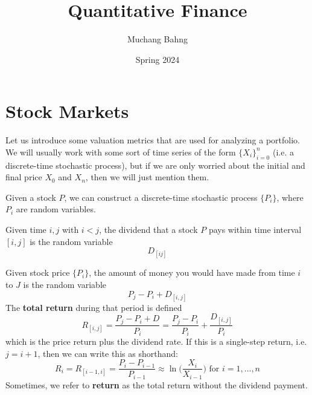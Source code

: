 \documentclass{article}
\begin{document}
\title{Quantitative Finance}
\author{Muchang Bahng}
\date{Spring 2024}

\maketitle
\tableofcontents
\pagebreak

\section{Stock Markets}

    Let us introduce some valuation metrics that are used for analyzing a portfolio. We will usually work with some sort of time series of the form $\{X_i\}_{i=0}^n$ (i.e. a discrete-time stochastic process), but if we are only worried about the initial and final price $X_0$ and $X_n$, then we will just mention them. 

    \begin{definition}
      Given a stock $P$, we can construct a discrete-time stochastic process $\{P_i\}$, where $P_i$ are random variables. 
    \end{definition}

    \begin{definition}[Dividend]
      Given time $i, j$ with $i < j$, the dividend that a stock $P$ pays within time interval $[i, j]$ is the random variable 
      \[D_{[i j]}\]
    \end{definition}

    \begin{definition}
      Given stock price $\{P_i\}$, the amount of money you would have made from time $i$ to $J$ is the random variable 
      \[P_j - P_i + D_{[i, j]}\]
      The \textbf{total return} during that period is defined 
      \[R_{[i, j]} = \frac{P_j - P_i + D}{P_i} = \frac{P_j - P_i}{P_i} + \frac{D_{[i, j]}}{P_i}\]
      which is the price return plus the dividend rate. If this is a single-step return, i.e. $j = i + 1$, then we can write this as shorthand: 
      \[R_{i} = R_{[i-1, i]} = \frac{P_i - P_{i-1}}{P_{i-1}} \approx \ln\bigg( \frac{X_i}{X_{i-1}} \bigg) \text{ for } i = 1, \ldots, n\]
      Sometimes, we refer to \textbf{return} as the total return without the dividend payment. 
    \end{definition}
\end{document}
